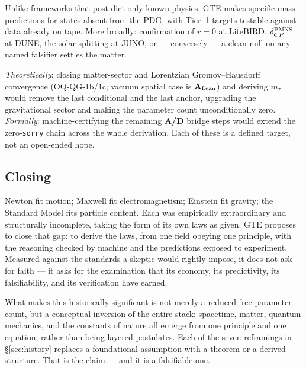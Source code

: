 \documentclass[11pt]{article}
\newcommand{\CatAL}{\ensuremath{\textbf{A}_{\rm Lean}}}
\newcommand{\CatAD}{\textbf{A/D}}
\begin{document}
Unlike frameworks
that post-dict only known physics, GTE makes specific mass predictions for states
absent from the PDG, with Tier~1 targets testable against data already on tape.
More broadly: confirmation of $r = 0$ at LiteBIRD, $\delta_{CP}^{\rm PMNS}$ at
DUNE, the solar splitting at JUNO, or --- conversely --- a clean null on any named
falsifier settles the matter.

\emph{Theoretically}: closing matter-sector and Lorentzian Gromov--Hausdorff convergence
(OQ-QG-1b/1c; vacuum spatial case is \CatAL) and deriving $m_\tau$ would remove the
last conditional and the last anchor, upgrading the gravitational sector and making
the parameter count unconditionally zero.  \emph{Formally}: machine-certifying the remaining \CatAD{}
bridge steps would extend the zero-\texttt{sorry} chain across the whole derivation.
Each of these is a defined target, not an open-ended hope.

\subsection{Closing}

Newton fit motion; Maxwell fit electromagnetism; Einstein fit gravity; the Standard
Model fits particle content.  Each was empirically extraordinary and structurally
incomplete, taking the form of its own laws as given.  GTE proposes to close that
gap: to derive the laws, from one field obeying one principle, with the reasoning
checked by machine and the predictions exposed to experiment.  Measured against the
standards a skeptic would rightly impose, it does not ask for faith --- it asks for
the examination that its economy, its predictivity, its falsifiability, and its
verification have earned.

What makes this historically significant is not merely a reduced free-parameter
count, but a conceptual inversion of the entire stack: spacetime, matter, quantum
mechanics, and the constants of nature all emerge from one principle and one
equation, rather than being layered postulates.  Each of the seven reframings in
§\ref{sec:history} replaces a foundational assumption with a theorem or a derived
structure.  That is the claim --- and it is a falsifiable one.
\end{document}
